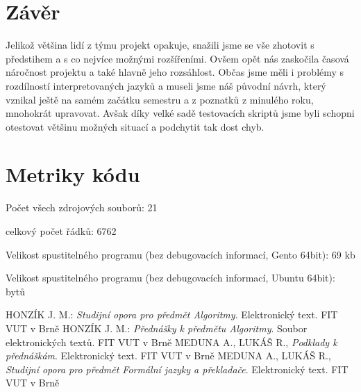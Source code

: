 \documentclass[12pt,a4paper,titlepage,final]{article}
\begin{document}
\section{Závěr} \label{zaver}
Jelikož většina lidí z týmu projekt opakuje, snažili jsme se vše zhotovit s předstihem a s co nejvíce možnými rozšířeními. Ovšem opět nás zaskočila časová náročnost projektu a také hlavně jeho rozsáhlost. Občas jsme měli i problémy s rozdílností interpretovaných jazyků a museli jsme náš původní návrh, který vznikal ještě na samém začátku semestru a z poznatků z minulého roku, mnohokrát upravovat. Avšak díky velké sadě testovacích skriptů jsme byli schopni otestovat většinu možných situací a podchytit tak dost chyb.

\appendix

\section{Metriky kódu} \label{metriky}
Počet všech zdrojových souborů: 21

celkový počet řádků: 6762

Velikost spustitelného programu (bez debugovacích informací, Gento 64bit): 69 kb

Velikost spustitelného programu (bez debugovacích informací, Ubuntu 64bit): bytů


\begin{thebibliography}{1}

HONZÍK J. M.: \emph{Studijní opora pro předmět Algoritmy}. Elektronický text. FIT VUT v Brně
HONZÍK J. M.: \emph{Přednášky k předmětu Algoritmy}. Soubor elektronických textů. FIT VUT v Brně
MEDUNA A., LUKÁŠ R., \emph{Podklady k přednáškám}. Elektronický text. FIT VUT v Brně
MEDUNA A., LUKÁŠ R., \emph{Studijní opora pro předmět Formální jazyky a překladače}. Elektronický text. FIT VUT v Brně


\end{thebibliography}
\appendix
\end{document}
